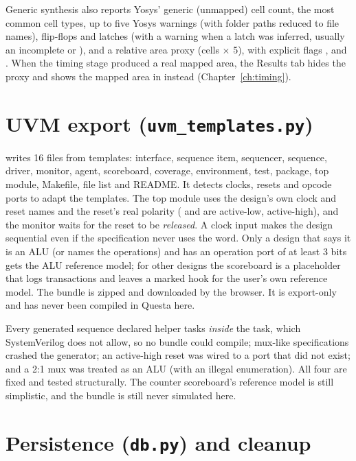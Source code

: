 Generic synthesis also reports Yosys' generic (unmapped) cell count, the most common cell types, up to five Yosys warnings (with folder paths reduced to file names), flip-flops and latches (with a warning when a latch was inferred, usually an incomplete  or ), and a relative area proxy (cells $\times$ 5), with explicit flags ,  and . When the timing stage produced a real mapped area, the Results tab hides the proxy and shows the mapped area in \umsq{} instead (Chapter~\ref{ch:timing}).

\section{UVM export (\texttt{uvm\_templates.py})}

 writes 16 files from templates: interface, sequence item, sequencer, sequence, driver, monitor, agent, scoreboard, coverage, environment, test, package, top module, Makefile, file list and README. It detects clocks, resets and opcode ports to adapt the templates. The top module uses the design's own clock and reset names and the reset's real polarity ( and  are active-low,  active-high), and the monitor waits for the reset to be \emph{released}. A clock input makes the design sequential even if the specification never uses the word. Only a design that says it is an ALU (or names the operations) and has an operation port of at least 3 bits gets the ALU reference model; for other designs the scoreboard is a placeholder that logs transactions and leaves a marked hook for the user's own reference model. The bundle is zipped and downloaded by the browser. It is export-only and has never been compiled in Questa here.

\begin{warnbox}
Every generated sequence declared helper tasks \emph{inside} the  task, which SystemVerilog does not allow, so no bundle could compile; mux-like specifications crashed the generator; an active-high reset was wired to a port that did not exist; and a 2:1 mux was treated as an ALU (with an illegal enumeration). All four are fixed and tested structurally. The counter scoreboard's reference model is still simplistic, and the bundle is still never simulated here.
\end{warnbox}

\section{Persistence (\texttt{db.py}) and cleanup}

